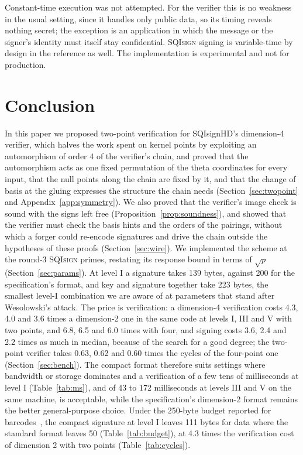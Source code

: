 \documentclass[version=preprint]{iacrcc}
\newcommand{\SQIsign}{SQI{\textsc{sign}}}
\begin{document}
    Constant-time execution was not attempted. For the verifier this is no
    weakness in the usual setting, since it handles only public data, so its
    timing reveals nothing secret; the exception is an application in which
    the message or the signer's identity must itself stay confidential.
    {\SQIsign} signing is variable-time by design in the reference as well. The
    implementation is experimental and not for production.

    \section{Conclusion}
    \label{sec:conc}

    In this paper we proposed two-point verification for SQIsignHD's
    dimension-4 verifier, which halves the work spent on kernel points by
    exploiting an automorphism of order 4 of the verifier's chain, and proved
    that the automorphism acts as one fixed permutation of the theta
    coordinates for every input, that the null points along the chain are
    fixed by it, and that the change of basis at the gluing expresses the
    structure the chain needs (Section~\ref{sec:twopoint} and
    Appendix~\ref{app:symmetry}). We also proved that the verifier's image
    check is sound with the signs left free (Proposition~\ref{prop:soundness}),
    and showed that the verifier must check the basis hints and the orders of
    the pairings, without which a forger could re-encode signatures and drive
    the chain outside the hypotheses of these proofs (Section~\ref{sec:wire}).
    We implemented the scheme at the round-3
    {\SQIsign} primes, restating its response bound in terms of $\sqrt{p}$
    (Section~\ref{sec:params}). At level I a signature takes 139 bytes, against 200 for the
    specification's format, and key and signature together take 223 bytes, the
    smallest level-I
    combination we are aware of at parameters that stand after
    Wesolowski's attack. The price is verification: a dimension-4
    verification costs 4.3, 4.0 and 3.6 times a dimension-2 one in
    the same code at levels I, III and V with two points, and 6.8, 6.5 and
    6.0 times with four, and
    signing costs 3.6, 2.4 and 2.2 times as much in median, because of the search
    for a good degree;
    the two-point verifier takes 0.63, 0.62 and 0.60 times the cycles of
    the four-point one (Section~\ref{sec:bench}). The compact format therefore suits settings
    where bandwidth or storage dominates and a verification of a few tens of
    milliseconds at level I (Table~\ref{tab:ms}), and of 43 to 172
    milliseconds at levels III and V on the same machine, is acceptable, while the specification's dimension-2 format
    remains the better general-purpose choice. Under the 250-byte budget
    reported for barcodes~\cite{SQI26i19}, the compact signature at level I
    leaves 111 bytes for data where the standard format leaves 50
    (Table~\ref{tab:budget}), at 4.3 times the verification cost of
    dimension 2 with two points (Table~\ref{tab:cycles}).
\end{document}
